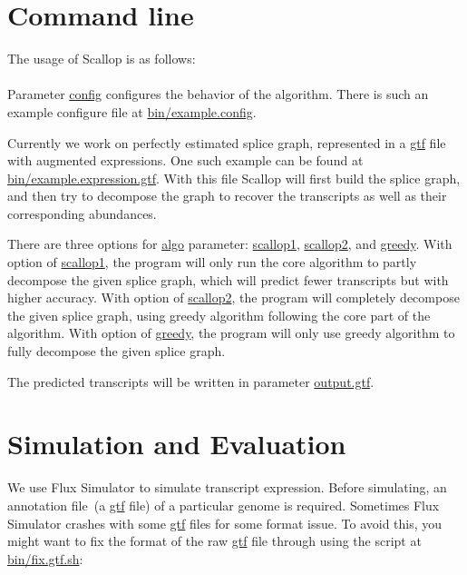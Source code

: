 \documentclass{llncs}
\begin{document}
\section{Command line}
The usage of Scallop is as follows:\\
\\

Parameter \url{config} configures the behavior of the algorithm.
There is such an example configure file at \url{bin/example.config}.

Currently we work on perfectly estimated splice graph, represented in a
\url{gtf} file with augmented expressions.  
One such example can be found at \url{bin/example.expression.gtf}.
With this file Scallop will first
build the splice graph, and then try to decompose the graph to
recover the transcripts as well as their corresponding abundances.

There are three options for \url{algo} parameter: \url{scallop1}, \url{scallop2}, and \url{greedy}.
With option of \url{scallop1}, the program will only run the core algorithm to partly
decompose the given splice graph, which will predict fewer transcripts but with
higher accuracy. With option of \url{scallop2}, the program will completely
decompose the given splice graph, using greedy algorithm following the core part of the algorithm.
With option of \url{greedy}, the program will only use greedy algorithm to fully decompose
the given splice graph.

The predicted transcripts will be written in parameter \url{output.gtf}.


\section{Simulation and Evaluation}
We use Flux Simulator to simulate transcript expression. Before simulating, an annotation
file~(a \url{gtf} file) of a particular genome is required. Sometimes Flux Simulator crashes
with some \url{gtf} files for some format issue. To avoid this, you might want to fix the
format of the raw \url{gtf} file through using the script at \url{bin/fix.gtf.sh}:\\
\\
\end{document}

